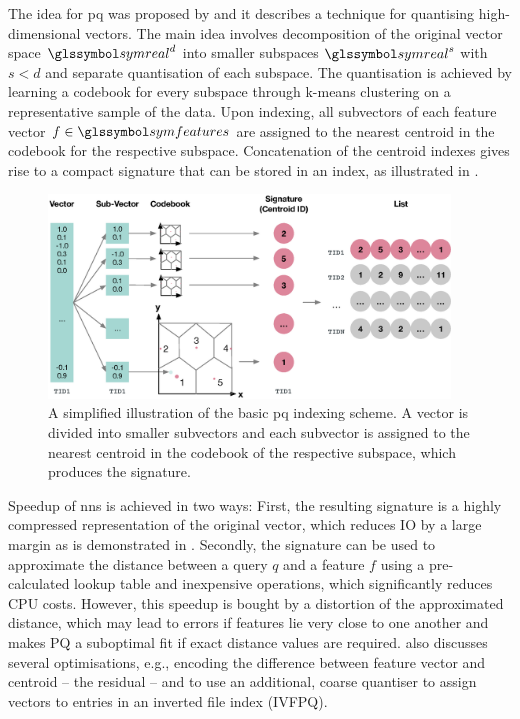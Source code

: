The idea for \acrshort{pq} was proposed by \cite{Jegou:2010Product} and it describes a technique for quantising high-dimensional vectors. The main idea involves decomposition of the original vector space $\symreal^d$ into smaller subspaces $\symreal^s$ with $s < d$ and separate quantisation of each subspace. The quantisation is achieved by learning a codebook for every subspace through k-means clustering on a representative sample of the data. Upon indexing, all subvectors of each feature vector $f \in \symfeatures$ are assigned to the nearest centroid in the codebook for the respective subspace. Concatenation of the centroid indexes gives rise to a compact signature that can be stored in an index, as illustrated in .

\begin{figure}[tb]
    \centering
    \includegraphics[width=0.95\textwidth]{figures/pq}
    \caption{A simplified illustration of the basic \acrshort{pq} indexing scheme. A vector is divided into smaller subvectors and each subvector is assigned to the nearest centroid in the codebook of the respective subspace, which produces the signature.}
    \label{fig:pq}
\end{figure}

Speedup of \acrshort{nns} is achieved in two ways: First, the resulting signature is a highly compressed representation of the original vector, which reduces IO by a large margin as is demonstrated in . Secondly, the signature can be used to approximate the distance between a query $q$ and a feature $f$ using a pre-calculated lookup table and inexpensive operations, which significantly reduces CPU costs. However, this speedup is bought by a distortion of the approximated distance, which may lead to errors if features lie very close to one another and makes PQ a suboptimal fit if exact distance values are required. \cite{Jegou:2010Product} also discusses several optimisations, e.g., encoding the difference between feature vector and centroid -- the residual -- and to use an additional, coarse quantiser to assign vectors to entries in an inverted file index (IVFPQ).

